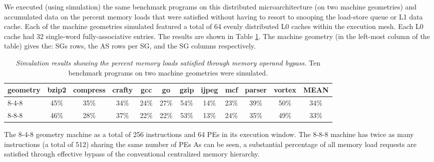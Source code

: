 \documentclass[10pt,dvips]{article}
\begin{document}
We executed (using simulation) the same benchmark programs on this 
distributed microarchitecture (on two machine geometries)
and accumulated data on
the percent memory loads that were satisfied without having to
resort to snooping the load-store queue or L1 data cache.
Each of the machine geometries simulated featured a total of 64
evenly distributed L0 caches within the execution mesh.
Each L0 cache had 32 single-word fully-associative entries.
The results are shown in Table \ref{tab:results}.
The machine geometry (in the left-most column of the table)
gives the: SGs rows, the AS rows per SG, and the SG columns respectively.
%
\begin{table}
\begin{center}
\caption{{\em Simulation results showing the percent memory loads
satisfied through memory operand bypass.}
Ten benchmark programs on two machine geometries were simulated.}
\label{tab:results}
\vspace{+0.1in}
\begin{tabular}{|l|c|c|c|c|c|c|c|c|c|c|c|}
\hline 
geometry&
bzip2&compress&crafty&gcc&go&gzip&ijpeg&mcf&parser&vortex&MEAN\\
\hline
\hline
8-4-8&45\%&35\%&34\%&24\%&27\%&54\%&14\%&23\%&39\%&50\%&34\%\\
\hline
8-8-8&46\%&28\%&37\%&22\%&22\%&53\%&13\%&24\%&35\%&49\%&33\%\\
\hline
\end{tabular}
\end{center}
\end{table}
%
The 8-4-8 geometry machine as a total of 256 instructions and 64 PEs in its
execution window.
The 8-8-8 machine has twice as many instructions (a total of 512)
sharing the same number of PEs
As can be seen, a substantial percentage of all memory load
requests are satisfied through effective bypass of the conventional
centralized memory hierarchy.
%
%
\end{document}
